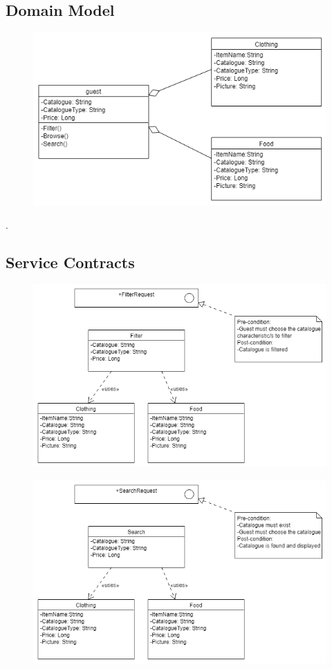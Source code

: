 \documentclass[12pt]{article}
\begin{document}
\subsection{Domain Model}
\begin{figure}[h]
\centering
\includegraphics[scale=0.7]{diagrams/dataDom.png}
\end{figure}.
\newpage

\subsection{Service Contracts}
\begin{figure}[h]
\centering
\includegraphics[scale=0.4]{diagrams/servView.png}
\end{figure}
\begin{figure}[h]
\centering
\includegraphics[scale=0.4]{diagrams/searchView.png}
\end{figure}
\end{document}
